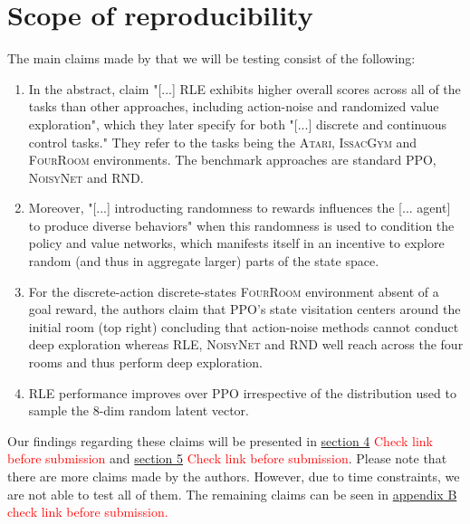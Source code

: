 \documentclass[10pt]{article} %
\begin{document}
\newpage
\section{Scope of reproducibility}
\label{sec:claims}

The main claims made by \cite{rle-paper} that we will be testing consist of the following:

\begin{enumerate}
    \item In the abstract, \cite{rle-paper} claim "[...] \textsc{RLE} exhibits higher overall scores across all of the tasks than other approaches, including action-noise and randomized value exploration", which they later specify for both "[...] discrete and continuous control tasks." They refer to the tasks being the \textsc{Atari}, \textsc{IssacGym} and \textsc{FourRoom} environments. The benchmark approaches are standard \textsc{PPO}, \textsc{NoisyNet} and \textsc{RND}.
    \item Moreover, "[...] introducting randomness to rewards influences the [... agent] to produce diverse behaviors" \citep{rle-paper} when this randomness is used to condition the policy and value networks, which manifests itself in an incentive to explore random (and thus in aggregate larger) parts of the state space.
    \item For the discrete-action discrete-states \textsc{FourRoom} environment absent of a goal reward, the authors claim that \textsc{PPO}'s state visitation centers around the initial room (top right) concluding that action-noise methods cannot conduct deep exploration whereas \textsc{RLE}, \textsc{NoisyNet} and \textsc{RND} well reach across the four rooms and thus perform deep exploration.
    \item \textsc{RLE} performance improves over \textsc{PPO} irrespective of the distribution used to sample the $8$-dim random latent vector.
\end{enumerate}

\noindent Our findings regarding these claims will be presented in \hyperlink{sec4}{section 4} \textcolor{red}{Check link before submission} and \hyperlink{sec5}{section 5} \textcolor{red}{Check link before submission}. Please note that there are more claims made by the authors. However, due to time constraints, we are not able to test all of them. The remaining claims can be seen in \hyperlink{untested-claims}{appendix B} \textcolor{red}{check link before submission.}
\end{document}
